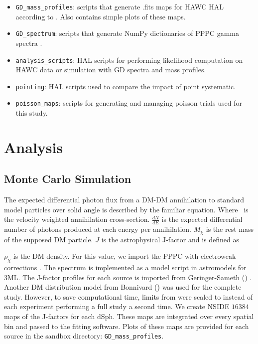 \begin{itemize}
    \item \texttt{GD\_mass\_profiles}: scripts that generate .fits maps for HAWC HAL according to \cite{Geringer-Sameth:2014yza}. Also contains simple plots of these maps.
    \item \texttt{GD\_spectrum}: scripts that generate NumPy dictionaries of PPPC gamma spectra \cite{Cirelli_2011}.
    \item \texttt{analysis\_scripts}: HAL scripts for performing likelihood computation on HAWC data or simulation with GD spectra and mass profiles.
    \item \texttt{pointing}: HAL scripts used to compare the impact of point systematic.
    \item \texttt{poisson\_maps}: scripts for generating and managing poisson trials used for this study.
\end{itemize}

\section{Analysis}\label{gd_analysis}

\subsection{Monte Carlo Simulation}\label{sec:gd_mc}
The expected differential photon flux from a DM-DM annihilation to standard model
particles over solid angle is described by the familiar equation.
\iddmannilation[\gamma]
Where \sv~is the velocity weighted annihilation cross-section.
$\frac{dN}{dE}$ is the expected differential number of photons produced at each energy per annihilation.
$M_\chi$ is the rest mass of the supposed DM particle.
$J$ is the astrophysical J-factor and is defined as

$\rho_{\chi}$ is the DM density.
For this value, we import the PPPC with electroweak corrections \cite{Cirelli_2011}.
The spectrum is implemented as a model script in astromodels for 3ML.
The J-factor profiles for each source is imported from Geringer-Sameth (\GS) \cite{Geringer_Sameth_2015}.
Another DM distribution model from Bonnivard (\B) \cite{Bonnivard:2014kza} was used for the complete study.
However, to save computational time, limits from \GS were scaled to \B instead of each experiment performing a full study a second time.
We create NSIDE $16384$ maps of the J-factors for each dSph.
These maps are integrated over every spatial bin and passed to the fitting software.
Plots of these maps are provided for each source in the sandbox directory: \texttt{GD\_mass\_profiles}.

